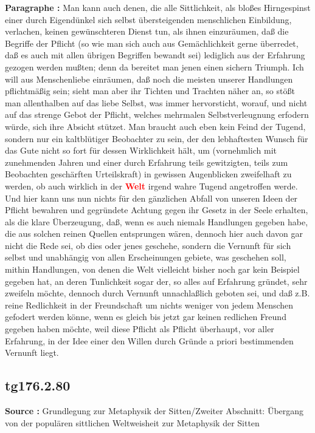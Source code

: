\documentclass[a4paper,12pt,twoside]{book}
\newcommand{\match}[1]{\textcolor{red}{\textbf{#1}}}
\begin{document}
	\noindent\textbf{Paragraphe : }Man kann auch denen, die alle Sittlichkeit, als bloßes Hirngespinst einer durch Eigendünkel sich selbst übersteigenden menschlichen Einbildung, verlachen, keinen gewünschteren Dienst tun, als ihnen einzuräumen, daß die Begriffe der Pflicht (so wie man sich auch aus Gemächlichkeit  gerne überredet, daß es auch mit allen übrigen Begriffen bewandt sei) lediglich aus der Erfahrung gezogen werden mußten; denn da bereitet man jenen einen sichern Triumph. Ich will aus Menschenliebe einräumen, daß noch die meisten unserer Handlungen pflichtmäßig sein; sieht man aber ihr Tichten und Trachten näher an, so stößt man allenthalben auf das liebe Selbst, was immer hervorsticht, worauf, und nicht auf das strenge Gebot der Pflicht, welches mehrmalen Selbstverleugnung erfodern würde, sich ihre Absicht stützet. Man braucht auch eben kein Feind der Tugend, sondern nur ein kaltblütiger Beobachter zu sein, der den lebhaftesten Wunsch für das Gute nicht so fort für dessen Wirklichkeit hält, um (vornehmlich mit zunehmenden Jahren und einer durch Erfahrung teils gewitzigten, teils zum Beobachten geschärften Urteilskraft) in gewissen Augenblicken zweifelhaft zu werden, ob auch wirklich in der \match{Welt} irgend wahre Tugend angetroffen werde. Und hier kann uns nun nichts für den gänzlichen Abfall von unseren Ideen der Pflicht bewahren und gegründete Achtung gegen ihr Gesetz in der Seele erhalten, als die klare Überzeugung, daß, wenn es auch niemals Handlungen gegeben habe, die aus solchen reinen Quellen entsprungen wären, dennoch hier auch davon gar nicht die Rede sei, ob dies oder jenes geschehe, sondern die Vernunft für sich selbst und unabhängig von allen Erscheinungen gebiete, was geschehen soll, mithin Handlungen, von denen die Welt vielleicht bisher noch gar kein Beispiel gegeben hat, an deren Tunlichkeit sogar der, so alles auf Erfahrung gründet, sehr zweifeln möchte, dennoch durch Vernunft unnachlaßlich geboten sei, und daß z.B. reine Redlichkeit in der Freundschaft um nichts weniger von jedem Menschen gefodert werden könne, wenn es gleich bis jetzt gar keinen redlichen Freund gegeben haben möchte, weil diese Pflicht als Pflicht überhaupt, vor aller Erfahrung, in der Idee einer den Willen durch Gründe a priori bestimmenden Vernunft liegt. 
	
	\subsection*{tg176.2.80} 
	\textbf{Source : }Grundlegung zur Metaphysik der Sitten/Zweiter Abschnitt: Übergang von der populären sittlichen Weltweisheit zur Metaphysik der Sitten\\  
	
\end{document}
